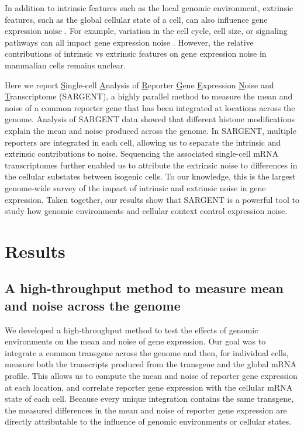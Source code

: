 In addition to intrinsic features such as the local genomic environment, extrinsic features, such as the global cellular state of a cell, can also influence gene expression noise \cite{elowitzmb_swainps:StochasticGene2002,ozbudakem_vanoudenaardena:RegulationNoise2002,nevesrp_iborrafj:ConnectingVariability2010,stewart-ornsteinj_el-samadh:CellularNoise2012,  sancheza_goldingi:GeneticDeterminants2013}. For example, variation in the cell cycle, cell size, or signaling pathways can all impact gene expression noise \cite{raja_vanoudenaardena:NatureNurture2008, raserjm_osheaek:ControlStochasticity2004, zopfcj_maheshrin:CellCycleDependence2013}. However, the relative contributions of intrinsic vs extrinsic features on gene expression noise in mammalian cells remains unclear.

Here we report \underline{S}ingle-cell \underline{A}nalysis of \underline{R}eporter \underline{G}ene \underline{E}xpression \underline{N}oise and \underline{T}ranscriptome (SARGENT), a highly parallel method to measure the mean and noise of a common reporter gene that has been integrated at locations across the genome. Analysis of SARGENT data showed that different histone modifications explain the mean and noise produced across the genome. In SARGENT, multiple reporters are integrated in each cell, allowing us to separate the intrinsic and extrinsic contributions to noise. Sequencing the associated single-cell mRNA transcriptomes further enabled us to attribute the extrinsic noise to differences in the cellular substates between isogenic cells. To our knowledge, this is the largest genome-wide survey of the impact of intrinsic and extrinsic noise in gene expression. Taken together, our results show that SARGENT is a powerful tool to study how genomic environments and cellular context control expression noise.

\section{Results}

\subsection{A high-throughput method to measure mean and noise across the genome}

We developed a high-throughput method to test the effects of genomic environments on the mean and noise of gene expression. Our goal was to integrate a common transgene across the genome and then, for individual cells, measure both the transcripts produced from the transgene and the global mRNA profile. This allows us to compute the mean and noise of reporter gene expression at each location, and correlate reporter gene expression with the cellular mRNA state of each cell. Because every unique integration contains the same transgene, the measured differences in the mean and noise of reporter gene expression are directly attributable to the influence of genomic environments or cellular states.

